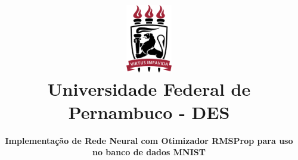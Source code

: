 
\title[Universidade Federal de Pernambuco]{\includegraphics[height=3cm]{Imagens/ufpe.png}\\
Universidade Federal de Pernambuco - DES
\\}
\author[Matheus Farias]{ \textbf{Implementação de Rede Neural com Otimizador RMSProp para uso no banco de dados MNIST}}

\begin{frame}
    \titlepage
\end{frame}
